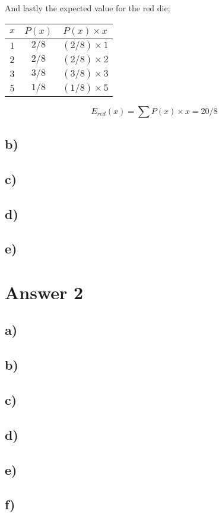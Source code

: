\documentclass[12pt]{article}
\begin{document}
And lastly the expected value for the red die;
\begin{center}
    \begin{tabular}{ c | c | c}
        $x$ & $P(x)$ & $P(x) \times x$ \\ 
        \hline
        $1$ & $2/8$ & $(2/8) \times 1$ \\
        $2$ & $2/8$ & $(2/8) \times 2$ \\
        $3$ & $3/8$ & $(3/8) \times 3$ \\
        $5$ & $1/8$ & $(1/8) \times 5$ \\
    \end{tabular}
\end{center}

\begin{equation}
    E_{red}(x) = \sum P(x)\times x = 20/8
\end{equation}


\subsection*{b)}
\subsection*{c)}
\subsection*{d)}
\subsection*{e)}

\section*{Answer 2}
\subsection*{a)}
\subsection*{b)}
\subsection*{c)}
\subsection*{d)}
\subsection*{e)}
\subsection*{f)}
\end{document}
